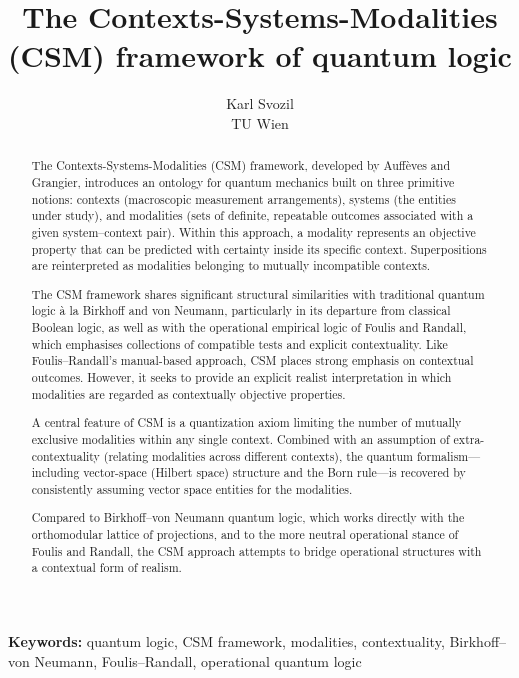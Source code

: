 \documentclass[11pt,a4paper]{article}
\title{The Contexts-Systems-Modalities (CSM) framework of quantum logic}
\author{Karl Svozil\\
TU Wien}
\date{}
\begin{document}
\maketitle

\begin{abstract}

The Contexts-Systems-Modalities (CSM) framework, developed by Auff\`eves and Grangier, introduces an ontology for quantum mechanics built on three primitive notions: contexts (macroscopic measurement arrangements), systems (the entities under study), and modalities (sets of definite, repeatable outcomes associated with a given system--context pair). Within this approach, a modality represents an objective property that can be predicted with certainty inside its specific context. Superpositions are reinterpreted as modalities belonging to mutually incompatible contexts.

The CSM framework shares significant structural similarities with traditional quantum logic \`a la Birkhoff and von Neumann, particularly in its departure from classical Boolean logic, as well as with the operational empirical logic of Foulis and Randall, which emphasises collections of compatible tests and explicit contextuality. Like Foulis--Randall's manual-based approach, CSM places strong emphasis on contextual outcomes. However, it seeks to provide an explicit realist interpretation in which modalities are regarded as contextually objective properties.

A central feature of CSM is a quantization axiom limiting the number of mutually exclusive modalities within any single context. Combined with an assumption of extra-contextuality (relating modalities across different contexts), the quantum formalism---including vector-space (Hilbert space) structure and the Born rule---is recovered by consistently assuming vector space entities for the modalities.

Compared to Birkhoff--von Neumann quantum logic, which works directly with the orthomodular lattice of projections, and to the more neutral operational stance of Foulis and Randall, the CSM approach attempts to bridge operational structures with a contextual form of realism.

\end{abstract}

\vspace{0.5cm}
\textbf{Keywords:} quantum logic, CSM framework, modalities, contextuality, Birkhoff--von Neumann, Foulis--Randall, operational quantum logic
\end{document}
